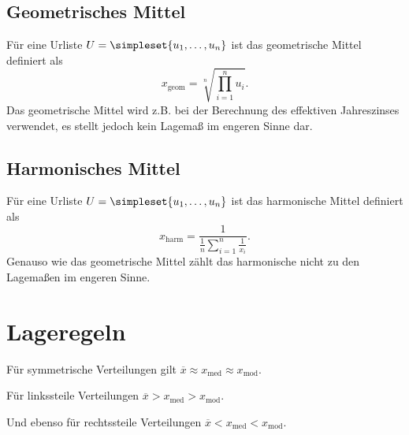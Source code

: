 \subsection{Geometrisches Mittel}
Für eine Urliste $U=\simpleset{u_1,\ldots,u_n}$ ist das geometrische Mittel definiert als
\begin{equation*}
	x_{\operatorname{geom}}=\sqrt[n]{\prod_{i=1}^n u_i}.
\end{equation*}
Das geometrische Mittel wird z.B. bei der Berechnung des effektiven Jahreszinses verwendet, es stellt jedoch kein Lagemaß im engeren Sinne dar.

\subsection{Harmonisches Mittel}
Für eine Urliste $U=\simpleset{u_1,\ldots,u_n}$ ist das harmonische Mittel definiert als
\begin{equation*}
	x_{\operatorname{harm}}=\frac{1}{\frac 1n\sum_{i=1}^n \frac 1{x_i}}.
\end{equation*}
Genauso wie das geometrische Mittel zählt das harmonische nicht zu den Lagemaßen im engeren Sinne.



\section{Lageregeln}
Für symmetrische Verteilungen gilt $\overline x\approx x_{\operatorname{med}}\approx x_{\operatorname{mod}}$.

Für linkssteile Verteilungen $\overline x> x_{\operatorname{med}}> x_{\operatorname{mod}}$.

Und ebenso für rechtssteile Verteilungen $\overline x< x_{\operatorname{med}}< x_{\operatorname{mod}}$.
